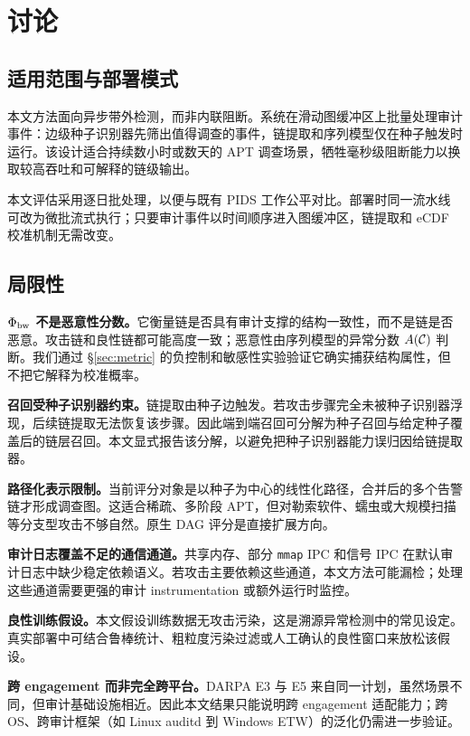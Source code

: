 \section{讨论}
\label{sec:discussion}

\subsection{适用范围与部署模式}

本文方法面向异步带外检测，而非内联阻断。系统在滑动图缓冲区上批量处理审计事件：边级种子识别器先筛出值得调查的事件，链提取和序列模型仅在种子触发时运行。该设计适合持续数小时或数天的 APT 调查场景，牺牲毫秒级阻断能力以换取较高吞吐和可解释的链级输出。

本文评估采用逐日批处理，以便与既有 PIDS 工作公平对比。部署时同一流水线可改为微批流式执行；只要审计事件以时间顺序进入图缓冲区，链提取和 eCDF 校准机制无需改变。

\subsection{局限性}

\textbf{$\Phi_{\text{bw}}$ 不是恶意性分数。}它衡量链是否具有审计支撑的结构一致性，而不是链是否恶意。攻击链和良性链都可能高度一致；恶意性由序列模型的异常分数 $A(\mathcal{C})$ 判断。我们通过 \S\ref{sec:metric} 的负控制和敏感性实验验证它确实捕获结构属性，但不把它解释为校准概率。

\textbf{召回受种子识别器约束。}链提取由种子边触发。若攻击步骤完全未被种子识别器浮现，后续链提取无法恢复该步骤。因此端到端召回可分解为种子召回与给定种子覆盖后的链层召回。本文显式报告该分解，以避免把种子识别器能力误归因给链提取器。

\textbf{路径化表示限制。}当前评分对象是以种子为中心的线性化路径，合并后的多个告警链才形成调查图。这适合稀疏、多阶段 APT，但对勒索软件、蠕虫或大规模扫描等分支型攻击不够自然。原生 DAG 评分是直接扩展方向。

\textbf{审计日志覆盖不足的通信通道。}共享内存、部分 \texttt{mmap} IPC 和信号 IPC 在默认审计日志中缺少稳定依赖语义。若攻击主要依赖这些通道，本文方法可能漏检；处理这些通道需要更强的审计 instrumentation 或额外运行时监控。

\textbf{良性训练假设。}本文假设训练数据无攻击污染，这是溯源异常检测中的常见设定。真实部署中可结合鲁棒统计、粗粒度污染过滤或人工确认的良性窗口来放松该假设。

\textbf{跨 engagement 而非完全跨平台。}DARPA E3 与 E5 来自同一计划，虽然场景不同，但审计基础设施相近。因此本文结果只能说明跨 engagement 适配能力；跨 OS、跨审计框架（如 Linux auditd 到 Windows ETW）的泛化仍需进一步验证。

